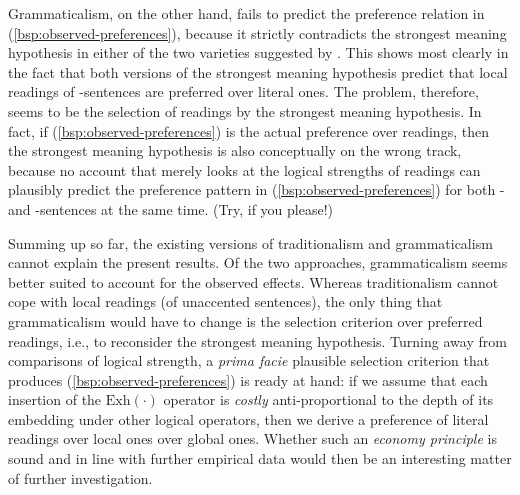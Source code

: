 \documentclass[fleqn,reqno,10pt,draft]{article}
\newcommand{\as}{\acro{as}}
\renewcommand{\es}{\acro{es}}
\newcommand{\exh}{\ensuremath{\mathrm{Exh}}}
\begin{document}
Grammaticalism, on the other hand, fails to predict the preference
relation in (\ref{bsp:observed-preferences}), because it strictly
contradicts the strongest meaning hypothesis in either of the two
varieties suggested by \citet{ChierchiaFox2008:The-Grammatical}. This
shows most clearly in the fact that both versions of the strongest
meaning hypothesis predict that local readings of \as-sentences are
preferred over literal ones. The problem, therefore, seems to be the
selection of readings by the strongest meaning hypothesis. In fact, if
(\ref{bsp:observed-preferences}) is the actual preference over
readings, then the strongest meaning hypothesis is also conceptually
on the wrong track, because no account that merely looks at the
logical strengths of readings can plausibly predict the preference
pattern in (\ref{bsp:observed-preferences}) for both \as- and
\es-sentences at the same time. (Try, if you please!) 

Summing up so far, the existing versions of traditionalism and
grammaticalism cannot explain the present results. Of the two
approaches, grammaticalism seems better suited to account for the
observed effects. Whereas traditionalism cannot cope with local
readings (of unaccented sentences), the only thing that grammaticalism
would have to change is the selection criterion over preferred
readings, i.e., to reconsider the strongest meaning
hypothesis. Turning away from comparisons of logical strength, a
\emph{prima facie} plausible selection criterion that produces
(\ref{bsp:observed-preferences}) is ready at hand: if we assume that
each insertion of the $\exh(\cdot)$ operator is \emph{costly}
anti-proportional to the depth of its embedding under other logical
operators, then we derive a preference of literal readings over local
ones over global ones. Whether such an \emph{economy principle} is
sound and in line with further empirical data would then be an
interesting matter of further investigation.
\end{document}
